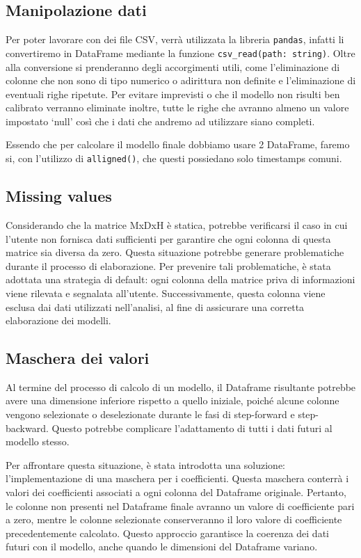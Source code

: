 \documentclass[a4paper,10pt]{article}
\begin{document}
\subsection{Manipolazione dati}
Per poter lavorare con dei file CSV, verrà utilizzata la libreria \texttt{pandas}, infatti li convertiremo in DataFrame 
mediante la funzione \texttt{csv\_read(path: string)}. Oltre alla conversione si prenderanno degli accorgimenti utili, come l'eliminazione di colonne
che non sono di tipo numerico o adirittura non definite e l'eliminazione di eventuali righe ripetute. Per evitare imprevisti o che il modello 
non risulti ben calibrato verranno eliminate inoltre, tutte le righe che avranno almeno un valore impostato `null' così che 
i dati che andremo ad utilizzare siano completi.

Essendo che per calcolare il modello finale dobbiamo usare 2 DataFrame, faremo si, con l'utilizzo di \texttt{alligned()}, che questi possiedano solo timestamps comuni.

\subsection{Missing values}

Considerando che la matrice MxDxH è statica, potrebbe verificarsi il caso in cui l'utente non fornisca dati sufficienti per garantire che ogni 
colonna di questa matrice sia diversa da zero. Questa situazione potrebbe generare problematiche durante il processo di elaborazione. 
Per prevenire tali problematiche, è stata adottata una strategia di default: ogni colonna della matrice priva di informazioni viene rilevata e segnalata 
all'utente. Successivamente, questa colonna viene esclusa dai dati utilizzati nell'analisi, al fine di assicurare una corretta elaborazione dei modelli.

\subsection{Maschera dei valori}

Al termine del processo di calcolo di un modello, il Dataframe risultante potrebbe avere una dimensione inferiore rispetto a quello iniziale, 
poiché alcune colonne vengono selezionate o deselezionate durante le fasi di step-forward e step-backward. Questo potrebbe complicare l'adattamento 
di tutti i dati futuri al modello stesso.

Per affrontare questa situazione, è stata introdotta una soluzione: l'implementazione di una maschera per i coefficienti. 
Questa maschera conterrà i valori dei coefficienti associati a ogni colonna del Dataframe originale. 
Pertanto, le colonne non presenti nel Dataframe finale avranno un valore di coefficiente pari a zero, mentre le colonne selezionate conserveranno 
il loro valore di coefficiente precedentemente calcolato. Questo approccio garantisce la coerenza dei dati futuri con il modello, 
anche quando le dimensioni del Dataframe variano.
\end{document}
